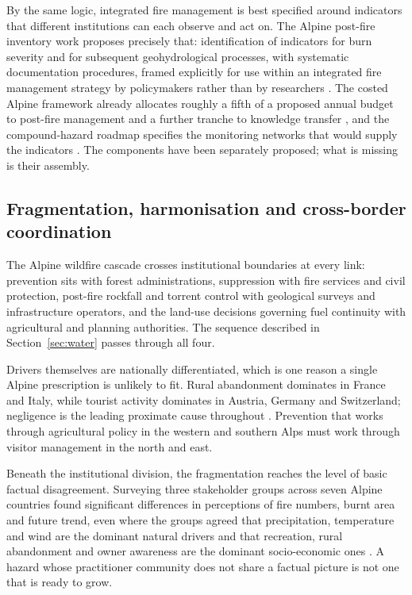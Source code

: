 \documentclass[11pt,a4paper]{article}
\begin{document}
By the same logic, integrated fire management is best specified around indicators that different institutions can each observe and act on. The Alpine post-fire inventory work proposes precisely that: identification of indicators for burn severity and for subsequent geohydrological processes, with systematic documentation procedures, framed explicitly for use within an integrated fire management strategy by policymakers rather than by researchers \citep{melzner_wildfire-induced_2025}. The costed Alpine framework already allocates roughly a fifth of a proposed annual budget to post-fire management and a further tranche to knowledge transfer \citep{muller_forest_2020}, and the compound-hazard roadmap specifies the monitoring networks that would supply the indicators \citep{baselt_compound_2026}. The components have been separately proposed; what is missing is their assembly.

\subsection{Fragmentation, harmonisation and cross-border coordination}

The Alpine wildfire cascade crosses institutional boundaries at every link: prevention sits with forest administrations, suppression with fire services and civil protection, post-fire rockfall and torrent control with geological surveys and infrastructure operators, and the land-use decisions governing fuel continuity with agricultural and planning authorities. The sequence described in Section~\ref{sec:water} passes through all four.

Drivers themselves are nationally differentiated, which is one reason a single Alpine prescription is unlikely to fit. Rural abandonment dominates in France and Italy, while tourist activity dominates in Austria, Germany and Switzerland; negligence is the leading proximate cause throughout \citep{muller_forest_2020}. Prevention that works through agricultural policy in the western and southern Alps must work through visitor management in the north and east.

Beneath the institutional division, the fragmentation reaches the level of basic factual disagreement. Surveying three stakeholder groups across seven Alpine countries found significant differences in perceptions of fire numbers, burnt area and future trend, even where the groups agreed that precipitation, temperature and wind are the dominant natural drivers and that recreation, rural abandonment and owner awareness are the dominant socio-economic ones \citep{hoang_stakeholders_2026}. A hazard whose practitioner community does not share a factual picture is not one that is ready to grow.
\end{document}
